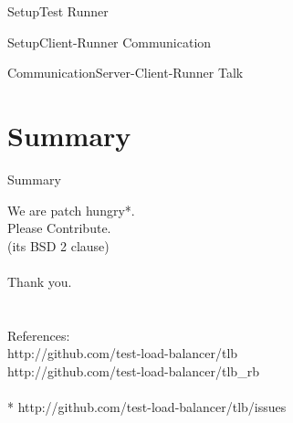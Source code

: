 \documentclass{beamer}
\begin{document}
\begin{frame}{Setup}{Test Runner}
  \begin{centering}
  \end{centering}
\end{frame}

\begin{frame}{Setup}{Client-Runner Communication}
  \begin{centering}
  \end{centering}
\end{frame}

\begin{frame}{Communication}{Server-Client-Runner Talk}
  \begin{centering}
  \end{centering}
\end{frame}


\section*{Summary}

\begin{frame}{Summary}{}
  \begin{centering}
  {\huge We are patch hungry*.\\Please Contribute.\\}
  (its BSD 2 clause)\\
  \quad\\
  {\huge Thank you.}\\
  \quad\\
  \quad\\
  References:\\
  http://github.com/test-load-balancer/tlb\\
  http://github.com/test-load-balancer/tlb\_rb\\
  \quad\\
  * http://github.com/test-load-balancer/tlb/issues\\
  \end{centering}
\end{frame}



\end{document}
